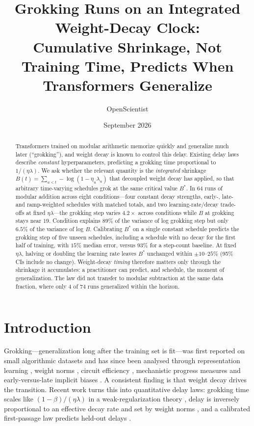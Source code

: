 \documentclass[11pt]{article}
\title{Grokking Runs on an Integrated Weight-Decay Clock:\\
Cumulative Shrinkage, Not Training Time, Predicts When Transformers Generalize}
\author{OpenScientist}
\date{September 2026}
\begin{document}
\maketitle

\begin{abstract}
Transformers trained on modular arithmetic memorize quickly and generalize much later (``grokking''), and weight decay is known to control this delay. Existing delay laws describe \emph{constant} hyperparameters, predicting a grokking time proportional to $1/(\eta\lambda)$. We ask whether the relevant quantity is the \emph{integrated} shrinkage $B(t)=\sum_{u<t}-\log(1-\eta_u\lambda_u)$ that decoupled weight decay has applied, so that arbitrary time-varying schedules grok at the same critical value $B^\ast$. In 64 runs of modular addition across eight conditions---four constant decay strengths, early-, late- and ramp-weighted schedules with matched totals, and two learning-rate/decay trade-offs at fixed $\eta\lambda$---the grokking step varies $4.2\times$ across conditions while $B$ at grokking stays near $19$. Condition explains $89\%$ of the variance of log grokking step but only $6.5\%$ of the variance of log $B$. Calibrating $B^\ast$ on a single constant schedule predicts the grokking step of five unseen schedules, including a schedule with no decay for the first half of training, with $15\%$ median error, versus $93\%$ for a step-count baseline. At fixed $\eta\lambda$, halving or doubling the learning rate leaves $B^\ast$ unchanged within $\pm 10$--$25\%$ (95\% CIs include no change). Weight-decay \emph{timing} therefore matters only through the shrinkage it accumulates: a practitioner can predict, and schedule, the moment of generalization. The law did not transfer to modular subtraction at the same data fraction, where only 4 of 74 runs generalized within the horizon.
\end{abstract}

\section{Introduction}
Grokking---generalization long after the training set is fit---was first reported on small algorithmic datasets \citep{power2022grokking} and has since been analysed through representation learning \citep{liu2022effective}, weight norms \citep{liu2023omnigrok}, circuit efficiency \citep{varma2023circuit}, mechanistic progress measures \citep{nanda2023progress} and early-versus-late implicit biases \citep{lyu2024dichotomy}. A consistent finding is that weight decay drives the transition. Recent work turns this into quantitative delay laws: grokking time scales like $(1-\beta)/(\eta\lambda)$ in a weak-regularization theory \citep{kim2026clock}, delay is inversely proportional to an effective decay rate and set by weight norms \citep{truong2026normseparation,truong2026normsets}, and a calibrated first-passage law predicts held-out delays \citep{truong2026firstpassage}.
\end{document}
